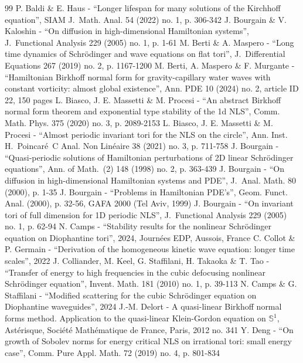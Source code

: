 \begin{thebibliography}{99}
 P. Baldi \& E. Haus - “Longer lifespan for many solutions of the Kirchhoff equation”, SIAM J. Math. Anal. 54 (2022) no. 1, p. 306-342
 J. Bourgain \& V. Kaloshin - “On diffusion in high-dimensional Hamiltonian systems”, J. Functional Analysis 229 (2005) no. 1, p. 1-61
 M. Berti \& A. Maspero - “Long time dynamics of Schrödinger and wave equations on flat tori”, J. Differential Equations 267 (2019) no. 2, p. 1167-1200
 M. Berti, A. Maspero \& F. Murgante - “Hamiltonian Birkhoff normal form for gravity-capillary water waves with constant vorticity: almost global existence”, Ann. PDE 10 (2024) no. 2, article ID 22, 150 pages
 L. Biasco, J. E. Massetti \& M. Procesi - “An abstract Birkhoff normal form theorem and exponential type stability of the 1d NLS”, Comm. Math. Phys. 375 (2020) no. 3, p. 2089-2153
 L. Biasco, J. E. Massetti \& M. Procesi - “Almost periodic invariant tori for the NLS on the circle”, Ann. Inst. H. Poincaré C Anal. Non Linéaire 38 (2021) no. 3, p. 711-758
 J. Bourgain - “Quasi-periodic solutions of Hamiltonian perturbations of 2D linear Schrödinger equations”, Ann. of Math. (2) 148 (1998) no. 2, p. 363-439
 J. Bourgain - “On diffusion in high-dimensional Hamiltonian systems and PDE”, J. Anal. Math. 80 (2000), p. 1-35
 J. Bourgain - “Problems in Hamiltonian PDE’s”, Geom. Funct. Anal. (2000), p. 32-56, GAFA 2000 (Tel Aviv, 1999)
 J. Bourgain - “On invariant tori of full dimension for 1D periodic NLS”, J. Functional Analysis 229 (2005) no. 1, p. 62-94
 N. Camps - “Stability results for the nonlinear Schrödinger equation on Diophantine tori”, 2024, Journées EDP, Aussois, France
 C. Collot \& P. Germain - “Derivation of the homogeneous kinetic wave equation: longer time scales”, 2022
 J. Colliander, M. Keel, G. Staffilani, H. Takaoka \& T. Tao - “Transfer of energy to high frequencies in the cubic defocusing nonlinear Schrödinger equation”, Invent. Math. 181 (2010) no. 1, p. 39-113
 N. Camps \& G. Staffilani - “Modified scattering for the cubic Schrödinger equation on Diophantine waveguides”, 2024
 J.-M. Delort - A quasi-linear Birkhoff normal forms method. Application to the quasi-linear Klein-Gordon equation on $\mathbb{S}^1$, Astérisque, Société Mathématique de France, Paris, 2012 no. 341
 Y. Deng - “On growth of Sobolev norms for energy critical NLS on irrational tori: small energy case”, Comm. Pure Appl. Math. 72 (2019) no. 4, p. 801-834

\end{thebibliography}
